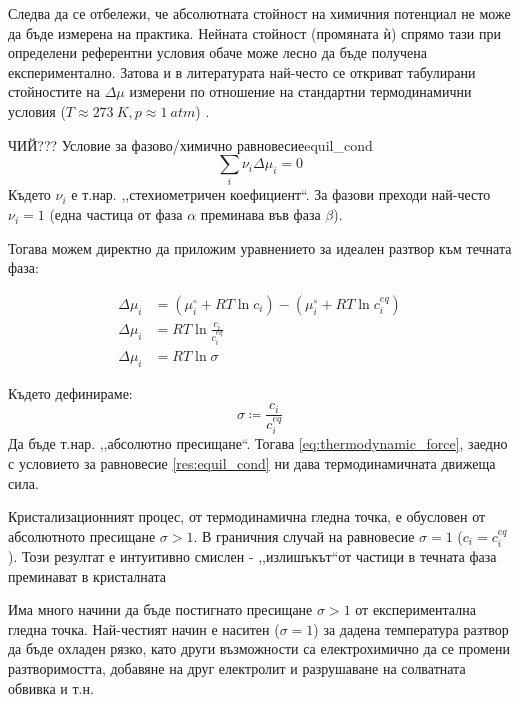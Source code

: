 \noindent Следва да се отбележи, че абсолютната стойност на химичния потенциал не може да бъде измерена на практика. Нейната стойност (промяната ѝ) спрямо тази при определени референтни условия обаче може лесно да бъде получена експериментално. Затова и в литературата най-често се откриват табулирани стойностите на $\Delta \mu$ измерени по отношение на стандартни термодинамични условия ($T \approx 273~K, p \approx 1~atm$) \cite{IvanMarkovCGB}\cite{atkinspaula2008}.

\begin{result}{ ЧИЙ??? Условие за фазово/химично равновесие}{equil_cond}
	\[\sum\limits_i \nu_i\Delta \mu_i  = 0\]
	Където $\nu_i$ е т.нар. ,,стехиометричен коефициент``. За фазови преходи най-често $\nu_i = 1$ (една частица от фаза $\alpha$ преминава във фаза $\beta$).
\end{result}

\noindent Тогава можем директно да приложим уравнението за идеален разтвор към течната фаза:

\begin{align}
	\Delta \mu_{i} & = \left( \mu_{i}^\circ + RT\ln{c_i} \right) - \left( \mu_{i}^\circ + RT\ln{c_{i}^{eq}} \right) \nonumber \\
	\Delta \mu_{i} & = RT\ln{\frac{c_i}{c_{i}^{eq}}} \nonumber                                                                \\
	\Delta \mu_{i} & = RT\ln{\sigma} \label{eq:thermodynamic_force}                                                           
\end{align}

\noindent Където дефинираме:
\begin{equation}
	\label{eq:abs_supersat}
	\sigma \coloneqq \frac{c_{i}}{c_{i}^{eq}}
\end{equation}
Да бъде т.нар. ,,абсолютно пресищане``. Тогава \autoref{eq:thermodynamic_force}, заедно с условието за равновесие \autoref{res:equil_cond} ни дава термодинамичната движеща сила.

Кристализационният процес, от термодинамична гледна точка, е обусловен от абсолютното пресищане $\sigma > 1$. В граничния случай на равновесие $\sigma = 1$ ($c_{i}  = c_{i}^{eq}$). Този резултат е интуитивно смислен - ,,излишъкът``от частици в течната фаза преминават в кристалната \cite{IvanMarkovCGB}

Има много начини да бъде постигнато пресищане $\sigma > 1$ от експериментална гледна точка. Най-честият начин е наситен ($\sigma = 1$) за дадена температура разтвор да бъде охладен рязко, като други възможности са електрохимично да се промени разтворимостта, добавяне на друг електролит и разрушаване на солватната обвивка и т.н. 

